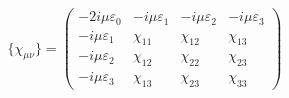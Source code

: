 \begin{equation}
\{ \chi_{\mu \nu} \} = \left( \begin{array} {cccc}
-2 i\mu\varepsilon_0 & -i\mu\varepsilon_1 & -i\mu\varepsilon_2 & -i\mu\varepsilon_3 \\
-i\mu\varepsilon_1   & \chi_{11}        &   \chi_{12}      &  \chi_{13}  \\
-i\mu\varepsilon_2   & \chi_{12}        &   \chi_{22}      &  \chi_{23}  \\
-i\mu\varepsilon_3   & \chi_{13}        &  \chi_{23}       &  \chi_{33} \end{array} \right)
\label{80}
\end{equation}

